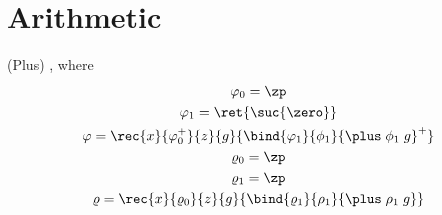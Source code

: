 
\section{Arithmetic}

\begin{lemma}(Plus)
\isVal{\plus}
{},
where 
\begin{gather*}
    \varphi_0 = \zp\\
    \varphi_1 = \ret{\suc{\zero}}\\
    \varphi= \rec{x}{\varphi_0^+}{z}{g}{\bind{\varphi_1}{\phi_1}{\plus\;\phi_1\;g}^+}\\
    \varrho_0 = \zp\\
    \varrho_1 = \zp\\
    \varrho= \rec{x}{\varrho_0}{z}{g}{\bind{\varrho_1}{\rho_1}{\plus\;\rho_1\;g}}\\
\end{gather*}
\end{lemma}

